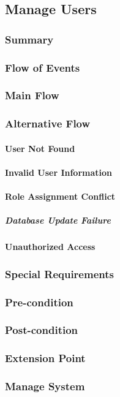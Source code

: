 \subsection{Manage Users}
\subsubsection{Summary}

\subsubsection{Flow of Events}
\subsubsection*{Main Flow}

\subsubsection*{Alternative Flow}
\paragraph{User Not Found}

\paragraph{Invalid User Information}

\paragraph{Role Assignment Conflict}

\subparagraph*{Database Update Failure}

\paragraph{Unauthorized Access}

\subsubsection{Special Requirements}

\subsubsection{Pre-condition}

\subsubsection{Post-condition}

\subsubsection{Extension Point}
\subsubsection*{Manage System}

